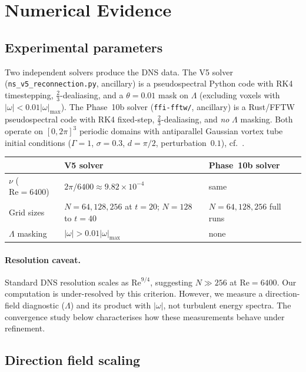 \documentclass[11pt,a4paper]{article}
\theoremstyle{definition}
\newcommand{\abs}[1]{\lvert #1 \rvert}
\newcommand{\Rey}{\mathrm{Re}}
\begin{document}
\section{Numerical Evidence}\label{sec:numerics}

\subsection{Experimental parameters}

Two independent solvers produce the DNS data.  The V5 solver
(\texttt{ns\_v5\_reconnection.py}, ancillary) is a pseudospectral
Python code with RK4 timestepping, $\tfrac{2}{3}$-dealiasing, and
a $\theta{=}0.01$ mask on $\Lambda$ (excluding voxels with
$\abs{\omega}<0.01\abs{\omega}_{\max}$).  The Phase~10b solver
(\texttt{ffi-fftw/}, ancillary) is a Rust/FFTW pseudospectral code
with RK4 fixed-step, $\tfrac{2}{3}$-dealiasing, and \emph{no}
$\Lambda$ masking.  Both operate on $[0,2\pi]^3$ periodic domains
with antiparallel Gaussian vortex tube initial conditions
($\Gamma=1$, $\sigma=0.3$, $d=\pi/2$, perturbation~$0.1$),
cf.~\cite{HouLi2006}.

\begin{center}
\begin{tabular}{llll}
\toprule
& V5 solver & Phase~10b solver \\
\midrule
$\nu$ ($\Rey=6400$) & $2\pi/6400 \approx 9.82\times10^{-4}$ & same \\
Grid sizes & $N=64,128,256$ at $t{=}20$; $N{=}128$ to $t{=}40$ & $N=64,128,256$ full runs \\
$\Lambda$ masking & $\abs{\omega}>0.01\abs{\omega}_{\max}$ & none \\
\bottomrule
\end{tabular}
\end{center}

\paragraph{Resolution caveat.}
Standard DNS resolution scales as $\Rey^{9/4}$, suggesting $N\gg256$
at $\Rey=6400$.  Our computation is under-resolved by this criterion.
However, we measure a direction-field diagnostic ($\Lambda$) and its
product with $\abs{\omega}$, not turbulent energy spectra.  The
convergence study below characterises how these measurements behave
under refinement.

\subsection{Direction field scaling}\label{sec:lambda-scaling}
\end{document}
